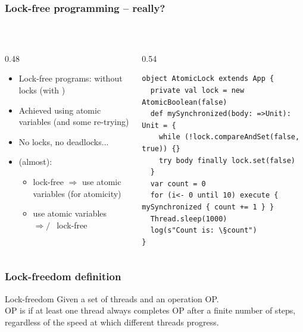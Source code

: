 \documentclass[aspectratio=169]{beamer}
\begin{document}
\begin{frame}[fragile]\frametitle{Lock-free programming -- really?}
~\\[-8mm]
\begin{columns}
\begin{column}{0.48\textwidth}
\begin{itemize}
  \item \alert{Lock-free programs}: without locks (with )
  \item Achieved using \alert{atomic variables} (and some re-trying)
  \item No locks, no deadlocks...
  \pause
  \item (almost):
    \begin{itemize}
      \item lock-free $\Rightarrow$ use atomic variables (for atomicity)
      \item use atomic variables $\Rightarrow\!\!\!\!\!\!\!/~~$ lock-free
    \end{itemize}
  \pause
\end{itemize}
\end{column}
\begin{column}{0.54\textwidth}
~\\
\begin{lstlisting}[emph={execute,sleep,log,compareAndSet,mySynchronized,AtomicBoolean}]
object AtomicLock extends App {
  private val lock = new AtomicBoolean(false)
  def mySynchronized(body: =>Unit): Unit = {
    while (!lock.compareAndSet(false, true)) {}
    try body finally lock.set(false)
  }
  var count = 0
  for (i<- 0 until 10) execute { mySynchronized { count += 1 } }
  Thread.sleep(1000)
  log(s"Count is: \§count")
}
\end{lstlisting}
\end{column}
\end{columns}
\end{frame}  


\begin{frame}\frametitle{Lock-freedom definition}

\begin{alertblock}{Lock-freedom}
  Given a set of threads and an operation \alert{OP}.
  \\
  \alert{OP} is  if at least one thread always completes \alert{OP} after a finite number of steps, regardless of the speed at which different threads progress.
\end{alertblock}
\end{frame}
\end{document}
